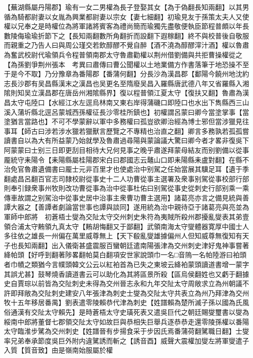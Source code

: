 【蕪湖縣屬丹陽郡】瑜有一女二男權為長子登娶其女【為于偽翻長知兩翻】以其男循為騎都尉妻以女胤為興業都尉妻以宗女【妻七細翻】初瑜見友于孫策太夫人又使權以兄奉之是時權位為將軍諸將賓客為禮尚簡而瑜獨先盡敬便執臣節程普頗以年長數陵侮瑜瑜折節下之【長知兩翻數所角翻折而設翻下遐稼翻】終不與校普後自敬服而親重之乃告人曰與周公瑾交若飲醇醪不覺自醉【酒不澆為醇醪滓汁酒】權以魯肅為奮武校尉代瑜領兵令程普領南郡太守魯肅勸權以荆州借劉備與共拒曹操權從之【為孫劉爭荆州張本　考異曰肅傳曰曹公聞權以土地業備方作書落筆于地恐操不至于是今不取】乃分豫章為番陽郡【番蒲何翻】分長沙為漢昌郡【鄱陽今饒州地沈約志長沙郡有吴昌縣漢末之漢昌也吴更名至隋廢吴昌入羅縣唐武德八年又省羅縣入湘隂則知吴立漢昌郡在唐岳州湘隂縣界】復以程普領江夏太守【復扶又翻】魯肅為漢昌太守屯陸口【水經江水左逕烏林南又東右岸得蒲磯口即陸口也水出下雋縣西三山溪入蒲圻縣北逕呂蒙城西孫權征長沙零桂所鎮也】初權謂呂蒙曰卿今當塗掌事【當塗猶言當路也】不可不學蒙辭以軍中多務權曰孤豈欲卿治經為博士邪但當涉獵見往事耳【師古曰涉若涉水獵若獵獸言歷覽之不專精也治直之翻】卿言多務孰若孤孤嘗讀書自以為大有所益蒙乃始就學及魯肅過尋陽與蒙論議大驚曰卿今者才畧非復吳下阿蒙蒙曰士别三日即更刮目相待大兄何見事之晚乎肅遂拜蒙母結友而别劉備以從事龎統守耒陽令【耒陽縣屬桂陽郡宋白曰郡國志云鼇山口即耒陽縣耒盧對翻】在縣不治免官魯肅遺備書曰龎士元非百里才也使處治中别駕之任始當展其驥足耳【遺于季翻處昌呂翻百官志司隸校尉從事史十二人功曹從事主選署及衆事别駕從事校部行部則奉引録衆事州牧則改功曹從事為治中從事杜佑曰别駕從事史從刺史行部别乘一乘傳車故謂之别駕治中從事史居中治事主衆曹功曹主選用】諸葛亮亦言之備見統與善譚大器之【善譚者劇論當世事也譚與談同】遂用統為治中親待亞于諸葛亮與亮並為軍師中郎將　初蒼梧士燮為交阯太守交州刺史朱符為夷賊所殺州郡擾亂燮表其弟壹領合浦太守䵋領九真太守【䵋胡悔翻又于鄙翻】武領南海太守燮體器寛厚中國士人多往依之雄長一州偏在萬里威尊無上【天下殽亂燮雄據偏州人但知威尊無復知有天子也長知兩翻】出入儀衛甚盛震服百蠻朝廷遣南陽張津為交州刺史津好鬼神事嘗著絳帕頭【好呼到翻著陟畧翻帕莫白翻項安世家說頭巾一名□音隖一名帕陸游曰袙頭者巾幘之類猶今言幞頭韓文公云以紅袙首為已失之東坡云絳袙蒙頭讀道書增一蒙字其誤尤甚】鼓琴燒香讀道書云可以助化為其將區景所殺【區烏侯翻姓也又虧于翻據史自賈琮以前皆為交阯刺史未得為交州晉志永和九年交阯太守周敞求立為州朝議不許即拜敞為交阯刺史建安八年張津為刺史士燮為交阯太守共表立為州乃拜津為交州牧十五年移居番禺】劉表遣零陵賴恭代津為刺史【姓譜賴為楚所滅子孫以國為氏風俗通漢有交阯太守賴先】是時蒼梧太守史璜死表又遣吳巨代之朝廷賜燮璽書以燮為綏南中郎將董督七郡領交阯太守如故巨與恭相失巨舉兵逐恭恭走還零陵孫權以番陽太守臨淮步騭為交州刺史【姓譜晉有步揚食采于步因氏焉番蒲荷翻騭職日翻】士燮率兄弟奉承節度吳巨外附内違騭誘而斬之【誘音酉】威聲大震權加燮左將軍燮遣子入質【質音致】由是嶺南始服屬於權

